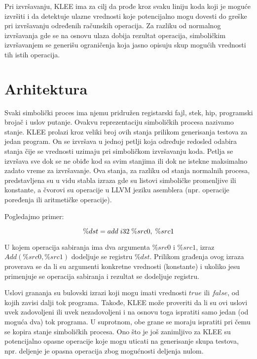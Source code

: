 \documentclass[a4paper]{article}
\begin{document}
{	Pri izvršavanju, KLEE ima za cilj da prođe kroz svaku liniju koda koji je moguće izvršiti i da detektuje ulazne vrednosti koje potencijalno mogu dovesti do greške pri izvršavanju određenih računskih operacija. Za razliku od normalnog izvršavanja gde se na osnovu ulaza dobija rezultat operacija, simboličkim izvršavanjem se generišu ograničenja koja jasno opisuju skup mogućih vrednosti tih istih operacija.

\section{Arhitektura}
\label{sec:arhitektura}

	Svaki simbolički proces ima njemu pridružen registarski fajl, stek, hip, programski brojač i uslov putanje. Ovakvu reprezentaciju simboličkih procesa nazivamo stanje. KLEE prolazi kroz veliki broj ovih stanja prilikom generisanja testova za jedan program. On se izvršava u jednoj petlji koja određuje redosled odabira stanja čije se vrednosti uzimaju pri simboličkom izvršavanju koda. Petlja se izvršava sve dok se ne obiđe kod sa svim stanjima ili dok ne istekne maksimalno zadato vreme za izvršavanje. Ova stanja, za razliku od stanja normalnih procesa, predstavljena su u vidu stabla izraza gde su listovi simboličke promenljive ili konstante, a čvorovi su operacije u LLVM jeziku asemblera (npr. operacije poređenja ili aritmetičke operacije).
	
	Pogledajmo primer:
	
	\begin{equation}
		 \%dst = add \hspace{1mm} i32 \hspace{1mm} \%src0, \hspace{1mm} \%src1
	\end{equation}
	
	U kojem operacija sabiranja ima dva argumenta $ \%src0 $ i $ \%src1 $, izraz $ Add(\%src0, \%src1) $ dodeljuje se registru $ \%dst $. Prilikom građenja ovog izraza proverava se da li su argumenti konkretne vrednosti (konstante) i ukoliko jesu primenjuje se operacija sabiranja i rezultat se dodeljuje registru. 
	
	Uslovi grananja su bulovski izrazi koji mogu imati vrednosti $ true $ ili $ false $, od kojih zavisi dalji tok programa. Takođe, KLEE može proveriti da li su ovi uslovi uvek zadovoljeni ili uvek nezadovoljeni i na osnovu toga ispratiti samo jedan (od moguća dva) tok programa. U suprotnom, obe grane se moraju ispratiti pri čemu se kopira stanje simboličkih procesa. Ono što je još zanimljivo za KLEE su potencijalno opasne operacije koje mogu uticati na generisanje skupa testova, npr. deljenje je opasna operacija zbog mogućnosti deljenja nulom.

}
\end{document}
